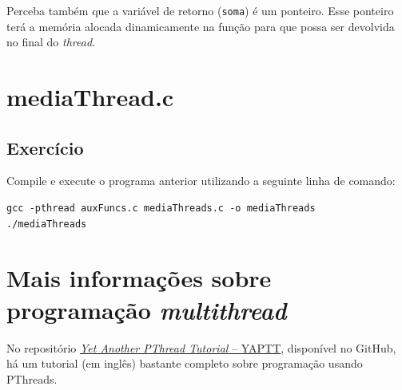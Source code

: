 Perceba também que a variável de retorno (\texttt{soma}) é um ponteiro. Esse ponteiro terá a memória alocada dinamicamente na função para que possa ser devolvida no final do \textit{thread}. 
\clearpage %

\section*{mediaThread.c}


\subsection{Exercício}
Compile e execute o programa anterior utilizando a seguinte linha de comando:

\begin{lstlisting}[style=MyBashStyle]
gcc -pthread auxFuncs.c mediaThreads.c -o mediaThreads
./mediaThreads
\end{lstlisting}




\section{Mais informações sobre programação \textit{multithread}}

No repositório \href{https://github.com/gradvohl/YAPTT}{\textit{Yet Another PThread Tutorial} -- YAPTT}, disponível no GitHub, há um tutorial (em inglês) bastante completo sobre programação usando PThreads.